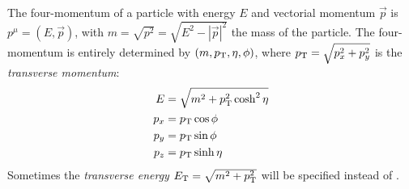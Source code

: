 The four-momentum of a particle with energy $E$ and vectorial momentum $\vec{p}$ is $p^\mu=(E,\vec{p})$, with $m=\sqrt{p^2}=\sqrt{E^2-|\vec{p}|^2}$ the mass of the particle.
The four-momentum is entirely determined by $(m,p_{\text{T}},\eta,\phi)$, where $p_{\text{T}}=\sqrt{p_x^2+p_y^2}$ is the \textit{transverse momentum}:
\begin{align}
E &= \sqrt{m^2+p_{\text{T}}^2 \cosh^2\eta}\\
p_x &= p_{\text{T}} \cos \phi\\
p_y &= p_{\text{T}} \sin \phi\\
p_z &= p_{\text{T}} \sinh \eta
\end{align}
Sometimes the \textit{transverse energy} $E_{\text{T}} = \sqrt{m^2+p_{\text{T}}^2}$ will be specified instead of \pT.

